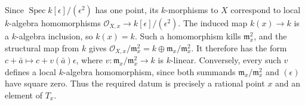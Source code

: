 Since $\operatorname{Spec}k[\epsilon]/(\epsilon^2)$ has one point, its $k$-morphisms to $X$ correspond to local $k$-algebra homomorphisms $\mathcal O_{X,x}\to k[\epsilon]/(\epsilon^2)$. The induced map $k(x)\to k$ is a $k$-algebra inclusion, so $k(x)=k$. Such a homomorphism kills $\mathfrak m_x^2$, and the structural map from $k$ gives $\mathcal O_{X,x}/\mathfrak m_x^2=k\oplus\mathfrak m_x/\mathfrak m_x^2$. It therefore has the form $c+\bar a\mapsto c+v(\bar a)\epsilon$, where $v:\mathfrak m_x/\mathfrak m_x^2\to k$ is $k$-linear. Conversely, every such $v$ defines a local $k$-algebra homomorphism, since both summands $\mathfrak m_x/\mathfrak m_x^2$ and $(\epsilon)$ have square zero. Thus the required datum is precisely a rational point $x$ and an element of $T_x$.
